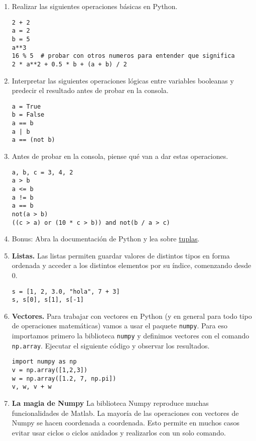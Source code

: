 \documentclass[a4paper,11pt]{article}
\theoremstyle{definition}
\begin{document}
\begin{enumerate}
\item
Realizar las siguientes operaciones básicas en Python.

\begin{lstlisting}
2 + 2
a = 2
b = 5
a**3
16 % 5  # probar con otros numeros para entender que significa
2 * a**2 + 0.5 * b + (a + b) / 2
\end{lstlisting}

\item Interpretar las siguientes operaciones l\'ogicas entre variables booleanas y predecir el resultado antes de probar en la consola.
\begin{lstlisting}
a = True
b = False
a == b
a | b
a == (not b)
\end{lstlisting}

\item Antes de probar en la consola, piense qué van a dar estas operaciones.
\begin{lstlisting}
a, b, c = 3, 4, 2
a > b
a <= b
a != b
a == b
not(a > b)
((c > a) or (10 * c > b)) and not(b / a > c)
\end{lstlisting}

\item Bonus: Abra la documentación de Python y lea sobre \href{https://docs.python.org/es/3/library/stdtypes.html\#tuples}{tuplas}.


\item \textbf{Listas.}
Las listas permiten guardar valores de distintos tipos en forma ordenada y acceder a los distintos elementos por su índice, comenzando desde 0.
\begin{lstlisting}
s = [1, 2, 3.0, "hola", 7 + 3]
s, s[0], s[1], s[-1]
\end{lstlisting}


\item \textbf{Vectores.}
Para trabajar con vectores en Python (y en general para todo tipo de operaciones matemáticas) vamos a usar el paquete \lstinline{numpy}. Para eso importamos primero la biblioteca \lstinline{numpy} y definimos vectores con el comando \lstinline{np.array}. Ejecutar el siguiente código y observar los resultados.

\begin{lstlisting}
import numpy as np
v = np.array([1,2,3])
w = np.array([1.2, 7, np.pi])
v, w, v + w
\end{lstlisting}

\item \textbf{La magia de Numpy} La biblioteca Numpy reproduce muchas funcionalidades de Matlab. La mayoría de las operaciones con vectores de Numpy se hacen coordenada a coordenada. Esto permite en muchos casos evitar usar ciclos o ciclos anidados y realizarlos con un solo comando.


\end{enumerate}
\end{document}
